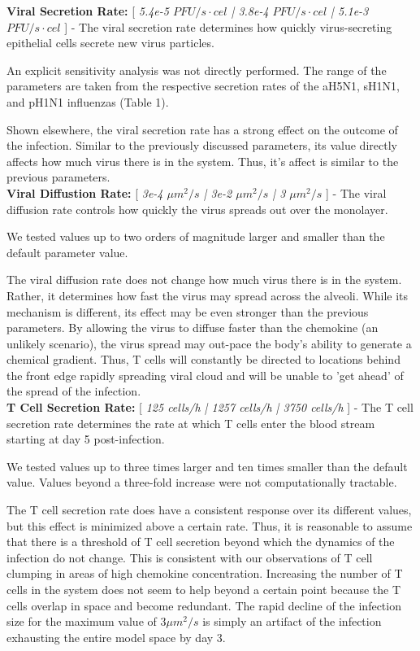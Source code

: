\documentclass[10pt]{article}
\begin{document}
\textbf{Viral Secretion Rate:} [ \textit{5.4e-5 $PFU/s\cdot cel$ | 3.8e-4 $PFU/s\cdot cel$ | 5.1e-3 $PFU/s\cdot cel$} ] - The viral secretion rate determines how quickly virus-secreting epithelial cells secrete new virus particles.

An explicit sensitivity analysis was not directly performed.  The range of the parameters are taken from the respective secretion rates of the aH5N1, sH1N1, and pH1N1 influenzas (Table 1).

Shown elsewhere, the viral secretion rate has a strong effect on the outcome of the infection.  Similar to the previously discussed parameters, its value directly affects how much virus there is in the system.  Thus, it's affect is similar to the previous parameters. \\


\textbf{Viral Diffustion Rate:} [ \textit{3e-4 $\mu m^2/s$ | 3e-2 $\mu m^2/s$ | 3 $\mu m^2/s$} ] - The viral diffusion rate controls how quickly the virus spreads out over the monolayer.

We tested values up to two orders of magnitude larger and smaller than the default parameter value.

The viral diffusion rate does not change how much virus there is in the system.  Rather, it determines how fast the virus may spread across the alveoli.  While its mechanism is different, its effect may be even stronger than the previous parameters.  By allowing the virus to diffuse faster than the chemokine (an unlikely scenario), the virus spread may out-pace the body's ability to generate a chemical gradient.  Thus, T cells will constantly be directed to locations behind the front edge rapidly spreading viral cloud and will be unable to 'get ahead' of the spread of the infection. \\


\textbf{T Cell Secretion Rate:} [ \textit{125 cells/h | 1257 cells/h | 3750 cells/h} ] - The T cell secretion rate determines the rate at which T cells enter the blood stream starting at day 5 post-infection.

We tested values up to three times larger and ten times smaller than the default value.  Values beyond a three-fold increase were not computationally tractable.

The T cell secretion rate does have a consistent response over its different values, but this effect is minimized above a certain rate.  Thus, it is reasonable to assume that there is a threshold of T cell secretion beyond which the dynamics of the infection do not change.  This is consistent with our observations of T cell clumping in areas of high chemokine concentration.  Increasing the number of T cells in the system does not seem to help beyond a certain point because the T cells overlap in space and become redundant.  The rapid decline of the infection size for the maximum value of $3 \mu m^2/s$ is simply an artifact of the infection exhausting the entire model space by day 3.
\end{document}
